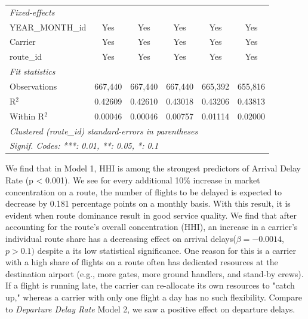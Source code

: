 \documentclass[preprint,12pt,authoryear]{elsarticle}
\begin{document}
\begin{table}[htbp]
\begin{tabular}{lccccc}
      \midrule
      \emph{Fixed-effects}\\
      YEAR\_MONTH\_id                   & Yes             & Yes             & Yes             & Yes             & Yes\\  
      Carrier                           & Yes             & Yes             & Yes             & Yes             & Yes\\  
      route\_id                         & Yes             & Yes             & Yes             & Yes             & Yes\\  
      \midrule
      \emph{Fit statistics}\\
      Observations                      & 667,440         & 667,440         & 667,440         & 665,392         & 655,816\\  
      R$^2$                             & 0.42609         & 0.42610         & 0.43018         & 0.43206         & 0.43813\\  
      Within R$^2$                      & 0.00046         & 0.00046         & 0.00757         & 0.01114         & 0.02000\\  
      \midrule \midrule
      \multicolumn{6}{l}{\emph{Clustered (route\_id) standard-errors in parentheses}}\\
      \multicolumn{6}{l}{\emph{Signif. Codes: ***: 0.01, **: 0.05, *: 0.1}}\\
   \end{tabular}
\end{table}
\FloatBarrier

\FloatBarrier



We find that in Model 1, HHI is among the strongest predictors of Arrival Delay Rate (p < 0.001). We see for every additional 10\% increase in market concentration on a route,  the number of flights to be delayed is expected to decrease by 0.181 percentage points on a monthly basis. With this result, it is evident when route dominance result in good service quality. We find that after accounting for the route’s overall concentration (HHI), an increase in a carrier's individual route share has a decreasing effect on arrival delays($\beta=-0.0014$,$p>0.1)$ despite a its low statistical significance. One reason for this is a carrier with a high share of flights on a route often has dedicated resources at the destination airport (e.g., more gates, more ground handlers, and stand-by crews). If a flight is running late, the carrier can re-allocate its own resources to "catch up," whereas a carrier with only one flight a day has no such flexibility. Compare to \textit{Departure Delay Rate} Model 2, we saw a positive effect on departure delays. 
\end{document}
